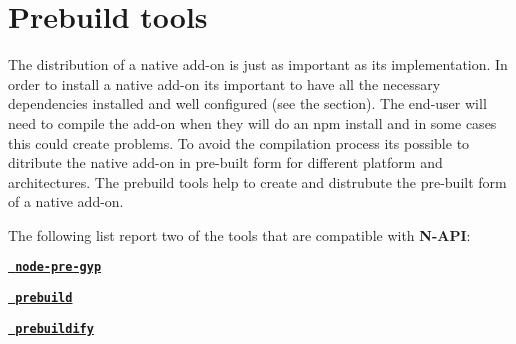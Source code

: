 \chapter{Prebuild tools}
\hypertarget{md__2_users_2hello_2_documents_2_git_hub_2finalproject-engine-drop-table-engines_2_engine_2src_2d4979075253bed086e26b3f0e466d73f}{}\label{md__2_users_2hello_2_documents_2_git_hub_2finalproject-engine-drop-table-engines_2_engine_2src_2d4979075253bed086e26b3f0e466d73f}
\label{md__2_users_2hello_2_documents_2_git_hub_2finalproject-engine-drop-table-engines_2_engine_2src_2d4979075253bed086e26b3f0e466d73f_autotoc_md7948}%
%


The distribution of a native add-\/on is just as important as its implementation. In order to install a native add-\/on it\textquotesingle{}s important to have all the necessary dependencies installed and well configured (see the  section). The end-\/user will need to compile the add-\/on when they will do an {\ttfamily npm install} and in some cases this could create problems. To avoid the compilation process it\textquotesingle{}s possible to ditribute the native add-\/on in pre-\/built form for different platform and architectures. The prebuild tools help to create and distrubute the pre-\/built form of a native add-\/on.

The following list report two of the tools that are compatible with {\bfseries{N-\/\+API}}\+:


\begin{DoxyItemize}
\item {\bfseries{\href{https://www.npmjs.com/package/node-pre-gyp}{\texttt{ node-\/pre-\/gyp}}}}
\item {\bfseries{\href{https://www.npmjs.com/package/prebuild}{\texttt{ prebuild}}}}
\item {\bfseries{\href{https://www.npmjs.com/package/prebuildify}{\texttt{ prebuildify}}}} 
\end{DoxyItemize}